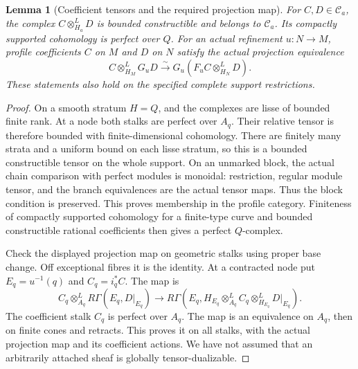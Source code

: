 \documentclass[11pt]{article}
\newtheorem{lemma}[theorem]{Lemma}
\theoremstyle{definition}
\theoremstyle{remark}
\begin{document}
\begin{lemma}[Coefficient tensors and the required projection map]
\label{lem:profile-tensor-projection}
For $C,D\in\mathcal C_a$, the complex $C\otimes^L_{H_a}D$ is
bounded constructible and belongs to $\mathcal C_a$.  Its compactly
supported cohomology is perfect over $Q$.
For an actual refinement $u:N\to M$, profile coefficients $C$ on $M$
and $D$ on $N$ satisfy the actual projection equivalence
\[
 C\otimes^L_{H_M}G_uD\xrightarrow{\sim}
 G_u(F_uC\otimes^L_{H_N}D).
\]
These statements also hold on the specified complete support restrictions.
\end{lemma}
\begin{proof}
On a smooth stratum $H=Q$, and the complexes are lisse of bounded
finite rank.  At a node both stalks are perfect over $A_q$.
Their relative tensor is therefore bounded with finite-dimensional
cohomology.  There are finitely many strata and a uniform bound
on each lisse stratum, so this is a bounded constructible tensor
on the whole support.  On an unmarked block, the actual chain
comparison with perfect modules is monoidal: restriction, regular
module tensor, and the branch equivalences are the actual tensor
maps.  Thus the block condition is preserved.  This proves membership
in the profile category.  Finiteness of compactly supported cohomology
for a finite-type curve and bounded constructible rational coefficients
then gives a perfect $Q$-complex.

Check the displayed projection map on geometric stalks using proper
base change. Off exceptional fibres it is the identity. At a
contracted node put $E_q=u^{-1}(q)$ and $C_q=i_q^*C$. The map is
\[
 C_q\otimes^L_{A_q}R\Gamma(E_q,D|_{E_q})
 \longrightarrow R\Gamma(E_q,
             H_{E_q}\otimes^L_{A_q}C_q
                    \otimes^L_{H_{E_q}}D|_{E_q}).
\]
The coefficient stalk $C_q$ is perfect over $A_q$.  The map is an equivalence on $A_q$, then on
finite cones and retracts.  This proves it on all stalks, with the
actual projection map and its coefficient actions.  We have not
assumed that an arbitrarily attached sheaf is globally tensor-dualizable.
\end{proof}
\end{document}
